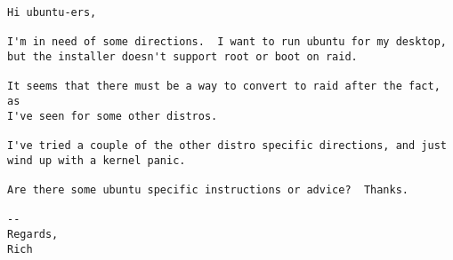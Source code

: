 \begin{lstlisting}
Hi ubuntu-ers,

I'm in need of some directions.  I want to run ubuntu for my desktop,
but the installer doesn't support root or boot on raid.  

It seems that there must be a way to convert to raid after the fact, as
I've seen for some other distros.

I've tried a couple of the other distro specific directions, and just
wind up with a kernel panic.  

Are there some ubuntu specific instructions or advice?  Thanks.

--
Regards,
Rich

\end{lstlisting}




